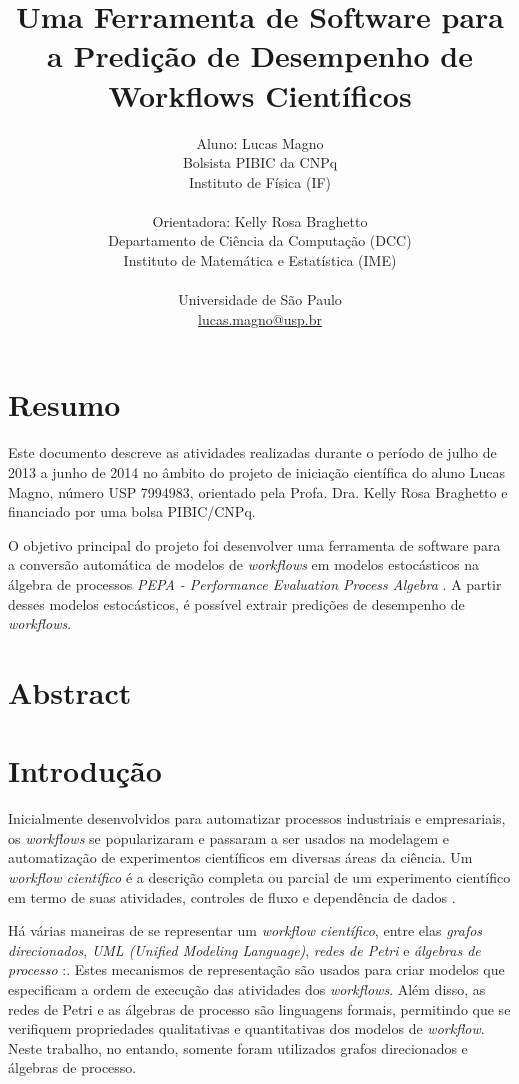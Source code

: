 \documentclass[a4paper,11pt]{article}
\date{}
\title{
    Uma Ferramenta de Software para a Predição de Desempenho de Workflows Científicos
}
\author{
    Aluno: Lucas Magno \\
    Bolsista PIBIC da CNPq \\
    Instituto de Física (IF) \\
    \\
    Orientadora: Kelly Rosa Braghetto\\
    Departamento de Ciência da Computação (DCC) \\
    Instituto de Matemática e Estatística (IME) \\
    \\
    Universidade de São Paulo \\
    \href{mailto:lucas.magno@usp.br}{lucas.magno@usp.br}
}
\begin{document}
    \maketitle
    \section*{Resumo}
    Este documento descreve as atividades realizadas durante o período de julho de 2013 a junho de 2014 no âmbito do projeto de iniciação científica do aluno Lucas Magno, número USP 7994983, orientado pela Profa. Dra. Kelly Rosa Braghetto e financiado por uma bolsa PIBIC/CNPq.

    O objetivo principal do projeto foi desenvolver uma ferramenta de software para a conversão automática de modelos de \emph{workflows} em modelos estocásticos na álgebra de processos \emph{PEPA - Performance Evaluation Process Algebra} \cite{web:pepa} . A partir desses modelos estocásticos, é possível extrair predições de desempenho de \emph{workflows}.
    \section*{Abstract}

    \newpage
    \section{Introdução}
        Inicialmente desenvolvidos para automatizar processos industriais e empresariais, os \emph{workflows} se popularizaram e passaram a ser usados na modelagem e automatização de experimentos científicos em diversas áreas da ciência. Um \emph{workflow científico} é a descrição completa ou parcial de um experimento científico em termo de suas atividades, controles de fluxo e dependência de dados \cite{phd:gadelha12}.

        Há várias maneiras de se representar um \emph{workflow científico}, entre elas \emph{grafos direcionados}, \emph{UML \emph{(Unified Modeling Language)}}, \emph{redes de Petri} e \emph{álgebras de processo} \cite{phd:oga11}:. Estes mecanismos de representação são usados para criar modelos que especificam a ordem de execução das atividades dos \emph{workflows}. Além disso, as redes de Petri e as álgebras de processo são linguagens formais, permitindo que se verifiquem propriedades qualitativas e quantitativas dos modelos de \emph{workflow}. Neste trabalho, no entando, somente foram utilizados grafos direcionados e álgebras de processo.
\end{document}

